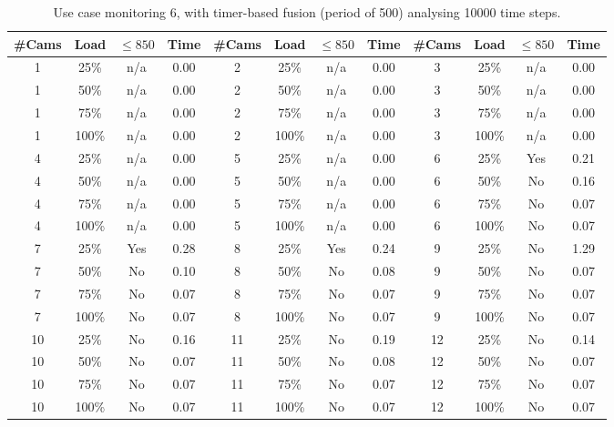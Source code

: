 \documentclass{article}
\begin{document}
\begin{table}
\centering
\begin{tabular}{|c|c|c|c|c|c|c|c|c|c|c|c|}
\hline
\#Cams & Load & $\leq 850$ & Time & \#Cams & Load & $\leq 850$ & Time & \#Cams & Load & $\leq 850$ & Time\\
\hline
1 & 25\% & n/a & 0.00 & 2 & 25\% & n/a & 0.00 & 3 & 25\% & n/a & 0.00\\
1 & 50\% & n/a & 0.00 & 2 & 50\% & n/a & 0.00 & 3 & 50\% & n/a & 0.00\\
1 & 75\% & n/a & 0.00 & 2 & 75\% & n/a & 0.00 & 3 & 75\% & n/a & 0.00\\
1 & 100\% & n/a & 0.00 & 2 & 100\% & n/a & 0.00 & 3 & 100\% & n/a & 0.00\\
\hline
4 & 25\% & n/a & 0.00 & 5 & 25\% & n/a & 0.00 & 6 & 25\% & Yes & 0.21\\
4 & 50\% & n/a & 0.00 & 5 & 50\% & n/a & 0.00 & 6 & 50\% & No & 0.16\\
4 & 75\% & n/a & 0.00 & 5 & 75\% & n/a & 0.00 & 6 & 75\% & No & 0.07\\
4 & 100\% & n/a & 0.00 & 5 & 100\% & n/a & 0.00 & 6 & 100\% & No & 0.07\\
\hline
7 & 25\% & Yes & 0.28 & 8 & 25\% & Yes & 0.24 & 9 & 25\% & No & 1.29\\
7 & 50\% & No & 0.10 & 8 & 50\% & No & 0.08 & 9 & 50\% & No & 0.07\\
7 & 75\% & No & 0.07 & 8 & 75\% & No & 0.07 & 9 & 75\% & No & 0.07\\
7 & 100\% & No & 0.07 & 8 & 100\% & No & 0.07 & 9 & 100\% & No & 0.07\\
\hline
10 & 25\% & No & 0.16 & 11 & 25\% & No & 0.19 & 12 & 25\% & No & 0.14\\
10 & 50\% & No & 0.07 & 11 & 50\% & No & 0.08 & 12 & 50\% & No & 0.07\\
10 & 75\% & No & 0.07 & 11 & 75\% & No & 0.07 & 12 & 75\% & No & 0.07\\
10 & 100\% & No & 0.07 & 11 & 100\% & No & 0.07 & 12 & 100\% & No & 0.07\\
\hline
\end{tabular}
\caption{Use case monitoring 6, with timer-based fusion (period of 500) analysing 10000 time steps.}
\end{table}
\end{document}
